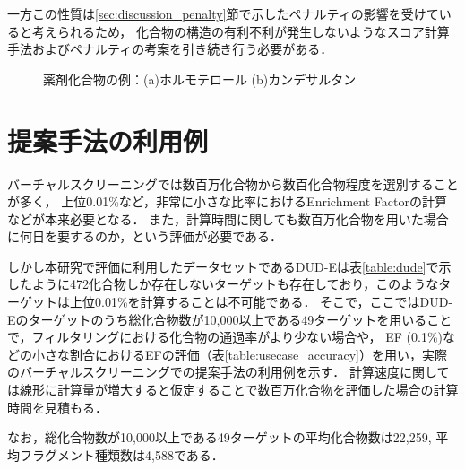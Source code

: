 一方この性質は\ref{sec:discussion_penalty}節で示したペナルティの影響を受けていると考えられるため，
化合物の構造の有利不利が発生しないようなスコア計算手法およびペナルティの考案を引き続き行う必要がある．

\begin{figure}[t]
 \begin{center}
 \end{center}
  \caption{薬剤化合物の例：(a)ホルモテロール (b)カンデサルタン}
  \label{fig:drugs}
\end{figure}


\section{提案手法の利用例}
バーチャルスクリーニングでは数百万化合物から数百化合物程度を選別することが多く\cite{Pulla2015, ShirgahiTalari2015}，
上位0.01\%など，非常に小さな比率におけるEnrichment Factorの計算などが本来必要となる．
また，計算時間に関しても数百万化合物を用いた場合に何日を要するのか，という評価が必要である．

しかし本研究で評価に利用したデータセットであるDUD-Eは表\ref{table:dude}で示したように472化合物しか存在しないターゲットも存在しており，このようなターゲットは上位0.01\%を計算することは不可能である．
そこで，ここではDUD-Eのターゲットのうち総化合物数が10,000以上である49ターゲットを用いることで，フィルタリングにおける化合物の通過率がより少ない場合や，
EF (0.1\%)などの小さな割合におけるEFの評価（表\ref{table:usecase_accuracy}）を用い，実際のバーチャルスクリーニングでの提案手法の利用例を示す．
計算速度に関しては線形に計算量が増大すると仮定することで数百万化合物を評価した場合の計算時間を見積もる．

なお，総化合物数が10,000以上である49ターゲットの平均化合物数は22,259, 平均フラグメント種類数は4,588である．

